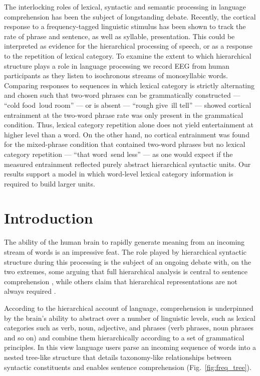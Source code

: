 \documentclass[10pt,letterpaper]{article}
\newcommand{\citet}[1]{\cite{#1}}
\begin{document}
The interlocking roles of lexical, syntactic and semantic processing in language comprehension has been the subject of longstanding debate. Recently, the cortical response to a frequency-tagged linguistic stimulus has been shown to track the rate of phrase and sentence, as well as syllable, presentation. This could be interpreted as evidence for the hierarchical processing of speech, or as a response to the repetition of lexical category. To examine the extent to which hierarchical structure plays a role in language processing we record EEG from human participants as they listen to isochronous streams of monosyllabic words. Comparing responses to sequences in which lexical category is strictly alternating and chosen such that two-word phrases can be grammatically constructed --- ``cold food loud room'' --- or is absent --- ``rough give ill tell'' --- showed cortical entrainment at the two-word phrase rate was only present in the grammatical condition. Thus, lexical category repetition alone does not yield entertainment at higher level than a word. On the other hand, no cortical entrainment was found for the mixed-phrase condition that contained two-word phrases but no lexical category repetition --- ``that word send less'' --- as one would expect if the measured entrainment reflected purely abstract hierarchical syntactic units. Our results support a model in which word-level lexical category information is required to build larger units.


\section*{Introduction}

The ability of the human brain to rapidly generate meaning from an incoming stream of words is an impressive feat. The role played by hierarchical syntactic structure during this processing is the subject of an ongoing debate with, on the two extremes, some arguing that full hierarchical analysis is central to sentence comprehension \citet{Chomsky1995,BerwickEtAl2013, EveraertEtAl2015}, while others claim that hierarchical representations are not always required \cite{FrankEtAl2012, FrankBod2011, FrankYang2018, FrankChristiansen2018}.

According to the hierarchical account of language, comprehension is underpinned by the brain's ability to abstract over a number of linguistic levels, such as lexical categories such as verb, noun, adjective, and  phrases (verb phrases, noun phrases and so on) and combine them hierarchically according to a set of grammatical principles. In this view language users parse an incoming sequence of words into a nested tree-like structure that details taxonomy-like relationships between syntactic constituents and enables sentence comprehension (Fig.~\ref{fig:freq_tree}). 
\end{document}
